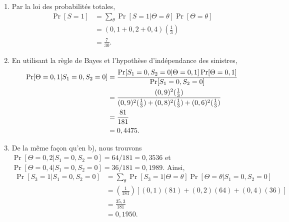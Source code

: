 \begin{exercice}
\begin{sol}
    \begin{enumerate}
    \item Par la loi des probabilités totales,
      \begin{align*}
        \Pr[S = 1]
        &= \sum_\theta \Pr[S = 1|\Theta = \theta] \Pr[\Theta = \theta] \\
        &= (0,1 + 0,2 + 0,4) \left(\frac{1}{3}\right) \\
        &= \frac{7}{30}.
      \end{align*}
    \item En utilisant la règle de Bayes et l'hypothèse d'indépendance
      des sinistres,
      \begin{align*}
        \Pr[\Theta = 0,1|S_1 = 0, S_2 = 0]
        &= \frac{\Pr[S_1 = 0, S_2 = 0|\Theta = 0,1] \Pr[\Theta = 0,1]}{%
          \Pr[S_1 = 0, S_2 = 0]} \\
        &= \frac{(0,9)^2 (\frac{1}{3})}{%
          (0,9)^2 (\frac{1}{3}) +
          (0,8)^2 (\frac{1}{3}) +
          (0,6)^2 (\frac{1}{3})} \\
        &= \frac{81}{181} \\
        &= 0,4475.
      \end{align*}
    \item De la même façon qu'en b), nous trouvons
      $\Pr[\Theta = 0,2|S_1 = 0, S_2 = 0] = 64/181 = 0,3536$ et
      $\Pr[\Theta = 0,4|S_1 = 0, S_2 = 0] = 36/181 = 0,1989$. Ainsi,
      \begin{align*}
        \Pr[S_3 = 1|S_1 = 0, S_2 = 0]
        &= \sum_\theta \Pr[S_3 = 1|\Theta = \theta] \Pr[\Theta = \theta|S_1 = 0, S_2 = 0] \\
        &= \left(\frac{1}{181}\right)[(0,1)(81) + (0,2)(64) + (0,4)(36)] \\
        &= \frac{35,3}{181} \\
        &= 0,1950.
      \end{align*}
    \end{enumerate}
  \end{sol}
\end{exercice}

